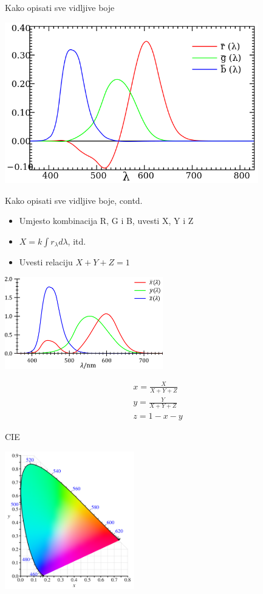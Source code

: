 \documentclass[9pt]{beamer}
\begin{document}
\begin{frame}{Kako opisati sve vidljive boje}
	\begin{center}
		\includegraphics[height=7cm]{slike/rgb_mathcing_fun.png}
	\end{center}
\end{frame}

\begin{frame}{Kako opisati sve vidljive boje, contd.}
	\begin{itemize}
		\item Umjesto kombinacija R, G i B, uvesti X, Y i Z
		\item $X = k \int r_{\lambda} d \lambda$, itd.
		\item Uvesti  relaciju $X + Y + Z = 1$
	\end{itemize}
	\begin{center}
		\includegraphics[height=4cm]{slike/CIE_1931_XYZ_Color_Matching_Functions.png}
	\end{center}
	\begin{align*}
	x = \frac{X}{X+Y+Z} \\
	y = \frac{Y}{X+Y+Z} \\
	z = 1-x-y
	\end{align*}
\end{frame}
\begin{frame}{CIE}
	\begin{center}
		\includegraphics[height=6cm]{slike/CIE1931xy_blank.png}
	\end{center}
\end{frame}
\end{document}
